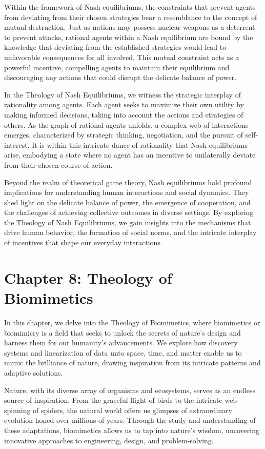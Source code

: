 \documentclass[ebook,12pt,oneside,openany]{memoir}
\begin{document}
\indent Within the framework of Nash equilibriums, the constraints that prevent agents from deviating from their chosen strategies bear a resemblance to the concept of mutual destruction. Just as nations may possess nuclear weapons as a deterrent to prevent attacks, rational agents within a Nash equilibrium are bound by the knowledge that deviating from the established strategies would lead to unfavorable consequences for all involved. This mutual constraint acts as a powerful incentive, compelling agents to maintain their equilibrium and discouraging any actions that could disrupt the delicate balance of power.

\indent In the Theology of Nash Equilibriums, we witness the strategic interplay of rationality among agents. Each agent seeks to maximize their own utility by making informed decisions, taking into account the actions and strategies of others. As the graph of rational agents unfolds, a complex web of interactions emerges, characterized by strategic thinking, negotiation, and the pursuit of self-interest. It is within this intricate dance of rationality that Nash equilibriums arise, embodying a state where no agent has an incentive to unilaterally deviate from their chosen course of action.

\indent Beyond the realm of theoretical game theory, Nash equilibriums hold profound implications for understanding human interactions and social dynamics. They shed light on the delicate balance of power, the emergence of cooperation, and the challenges of achieving collective outcomes in diverse settings. By exploring the Theology of Nash Equilibriums, we gain insights into the mechanisms that drive human behavior, the formation of social norms, and the intricate interplay of incentives that shape our everyday interactions.
\chapter*{Chapter 8: Theology of Biomimetics}


\indent \indent In this chapter, we delve into the Theology of Biomimetics, where biomimetics or biomimicry is a field that seeks to unlock the secrets of nature's design and harness them for our humanity’s advancements. We explore how discovery systems and linearization of data unto space, time, and matter enable us to mimic the brilliance of nature, drawing inspiration from its intricate patterns and adaptive solutions.

\indent Nature, with its diverse array of organisms and ecosystems, serves as an endless source of inspiration. From the graceful flight of birds to the intricate web-spinning of spiders, the natural world offers us glimpses of extraordinary evolution honed over millions of years. Through the study and understanding of these adaptations, biomimetics allows us to tap into nature's wisdom, uncovering innovative approaches to engineering, design, and problem-solving.
\end{document}
